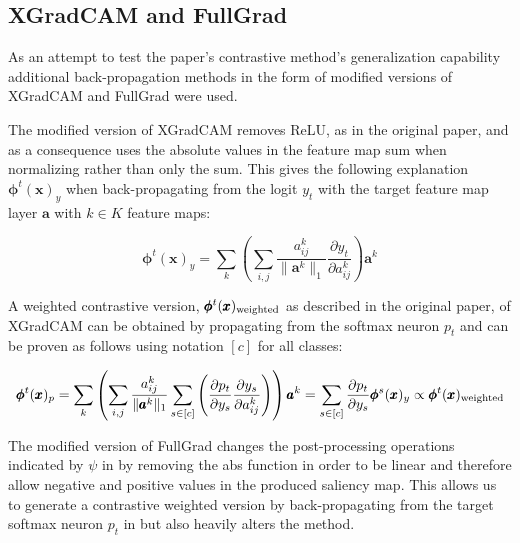 \subsection{XGradCAM and FullGrad}
\label{SectionXGradCAM}
As an attempt to test the paper's contrastive method's generalization capability additional back-propagation methods in the form of modified versions of XGradCAM \citep{xgradcam} and FullGrad \citep{srinivasFullgradientRepresentationNeural2019} were used. 

The modified version of XGradCAM removes ReLU, as in the original paper, and as a consequence uses the absolute values in the feature map sum when normalizing rather than only the sum. This gives the following explanation $\pmb{\phi}^t(\pmb{x})_y$ when back-propagating from the logit $y_t$ with the target feature map layer $\pmb{a}$ with $k \in K$ feature maps:

\begin{equation}
    \pmb{\phi}^t(\pmb{x})_y = \sum_{k}\left(\sum_{i,j} \frac{a_{ij}^k}{\|\pmb{a}^k\|_1} \frac{\partial y_t}{\partial a_{ij}^k}\right)\pmb{a}^k %
\end{equation}

A weighted contrastive version, $\pmb{\phi}^t(\pmb{x})_{\textnormal{weighted}}$ as described in the original paper, of XGradCAM can be obtained by propagating from the softmax neuron $p_t$ and can be proven as follows using notation $[c]$ for all classes:

\begin{equation}
    \pmb{\phi}^t(\pmb{x})_p = \sum_{k}\left(\sum_{i,j} \frac{a_{ij}^k}{\|\pmb{a}^k\|_1} \sum_{s \in [c]}\left( \frac{\partial p_t}{\partial y_s}\frac{\partial y_s}{\partial a_{ij}^k}\right)\right)\pmb{a}^k = \sum_{s \in [c]} \frac{\partial p_t}{\partial y_s} \pmb{\phi}^s(\pmb{x})_y \propto \pmb{\phi}^t(\pmb{x})_{\textnormal{weighted}}
\end{equation}

The modified version of FullGrad changes the post-processing operations indicated by $\psi$ in \citep{srinivasFullgradientRepresentationNeural2019} by removing the abs function in order to be linear and therefore allow negative and positive values in the produced saliency map. This allows us to generate a contrastive weighted version by back-propagating from the target softmax neuron $p_t$ in but also heavily alters the method. 

